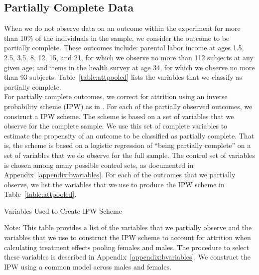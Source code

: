 \subsection{Partially Complete Data}
\label{app:method_partialobs}

When we do not observe data on an outcome within the experiment for more than 10\% of the individuals in the sample, we consider the outcome to be partially complete. These outcomes include: parental labor income at ages 1.5, 2.5, 3.5, 8, 12, 15, and 21, for which we observe no more than 112 subjects at any given age; and items in the health survey at age 34, for which we observe no more than 93 subjects. Table~\ref{table:attpooled} lists the variables that we classify as partially complete.\\

\noindent For partially complete outcomes, we correct for attrition using an inverse probability scheme (IPW) as in  \citet{Horvitz_Thompson_1952_JASA}. For each of the partially observed outcomes, we construct a IPW scheme. The scheme is based on a set of variables that we observe for the complete sample. We use this set of complete variables to estimate the propensity of an outcome to be classified as partially complete. That is, the scheme is based on a logistic regression of ``being partially complete'' on a set of variables that we do observe for the full sample. The control set of variables is chosen among many possible control sets,  as documented in Appendix~\ref{appendix:bvariables}. For each of the outcomes that we partially observe, we list the variables that we use to produce the IPW scheme in Table~\ref{table:attpooled}.

\begin{table}
\begin{threeparttable}
\caption{Variables Used to Create IPW Scheme}
\label{table:attpooled}
\centering

\begin{tablenotes}
\footnotesize
\item Note: This table provides a list of the variables that we partially observe and the variables that we use to construct the IPW scheme to account for attrition when calculating treatment effects pooling females and males. The procedure to select these variables is described in Appendix~\ref{appendix:bvariables}. We construct the IPW using a common model across males and females.
\end{tablenotes}
\end{threeparttable}
\end{table}
\restoregeometry
\doublespacing

